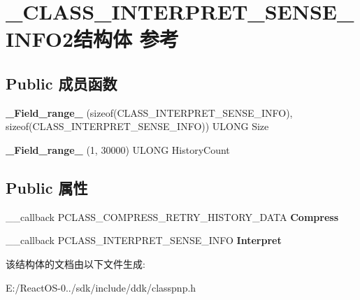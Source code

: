 \hypertarget{struct___c_l_a_s_s___i_n_t_e_r_p_r_e_t___s_e_n_s_e___i_n_f_o2}{}\section{\+\_\+\+C\+L\+A\+S\+S\+\_\+\+I\+N\+T\+E\+R\+P\+R\+E\+T\+\_\+\+S\+E\+N\+S\+E\+\_\+\+I\+N\+F\+O2结构体 参考}
\label{struct___c_l_a_s_s___i_n_t_e_r_p_r_e_t___s_e_n_s_e___i_n_f_o2}
\subsection*{Public 成员函数}
\begin{DoxyCompactItemize}
\item 
\mbox{\label{struct___c_l_a_s_s___i_n_t_e_r_p_r_e_t___s_e_n_s_e___i_n_f_o2_ad2299be237690e0537b72804a51f01bb}} 
{\bfseries \+\_\+\+Field\+\_\+range\+\_\+} (sizeof(C\+L\+A\+S\+S\+\_\+\+I\+N\+T\+E\+R\+P\+R\+E\+T\+\_\+\+S\+E\+N\+S\+E\+\_\+\+I\+N\+FO), sizeof(C\+L\+A\+S\+S\+\_\+\+I\+N\+T\+E\+R\+P\+R\+E\+T\+\_\+\+S\+E\+N\+S\+E\+\_\+\+I\+N\+FO)) U\+L\+O\+NG Size
\item 
\mbox{\label{struct___c_l_a_s_s___i_n_t_e_r_p_r_e_t___s_e_n_s_e___i_n_f_o2_abf285697296cf02f85c96d5d6abc785f}} 
{\bfseries \+\_\+\+Field\+\_\+range\+\_\+} (1, 30000) U\+L\+O\+NG History\+Count
\end{DoxyCompactItemize}
\subsection*{Public 属性}
\begin{DoxyCompactItemize}
\item 
\mbox{\label{struct___c_l_a_s_s___i_n_t_e_r_p_r_e_t___s_e_n_s_e___i_n_f_o2_a1efe3190316a6b34bb801f3afa36544e}} 
\+\_\+\+\_\+callback P\+C\+L\+A\+S\+S\+\_\+\+C\+O\+M\+P\+R\+E\+S\+S\+\_\+\+R\+E\+T\+R\+Y\+\_\+\+H\+I\+S\+T\+O\+R\+Y\+\_\+\+D\+A\+TA {\bfseries Compress}
\item 
\mbox{\label{struct___c_l_a_s_s___i_n_t_e_r_p_r_e_t___s_e_n_s_e___i_n_f_o2_ac987384df4bdf41d98f71b917a419365}} 
\+\_\+\+\_\+callback P\+C\+L\+A\+S\+S\+\_\+\+I\+N\+T\+E\+R\+P\+R\+E\+T\+\_\+\+S\+E\+N\+S\+E\+\_\+\+I\+N\+FO {\bfseries Interpret}
\end{DoxyCompactItemize}


该结构体的文档由以下文件生成\+:\begin{DoxyCompactItemize}
\item 
E\+:/\+React\+O\+S-\/0../sdk/include/ddk/classpnp.\+h\end{DoxyCompactItemize}
